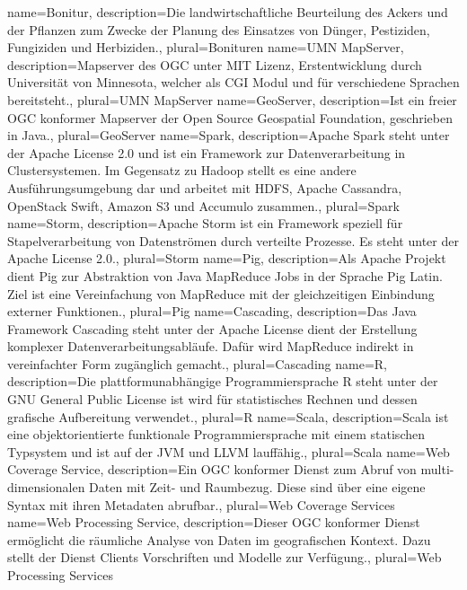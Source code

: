 {
  name=Bonitur,
  description={Die landwirtschaftliche Beurteilung des Ackers und der Pflanzen zum Zwecke der Planung des Einsatzes von Dünger, Pestiziden, Fungiziden und Herbiziden.},
  plural=Bonituren
}
{
  name=UMN MapServer,
  description={Mapserver des OGC unter MIT Lizenz, Erstentwicklung durch Universität von Minnesota, welcher als CGI Modul und für verschiedene Sprachen  bereitsteht.},
  plural=UMN MapServer
}
{
  name=GeoServer,
  description={Ist ein freier OGC konformer Mapserver der Open Source Geospatial Foundation, geschrieben in Java.},
  plural=GeoServer
}
{
  name=Spark,
  description={Apache Spark steht unter der Apache License 2.0 und ist ein Framework zur Datenverarbeitung in Clustersystemen. Im Gegensatz zu Hadoop stellt es eine andere Ausführungsumgebung dar und arbeitet mit HDFS, Apache Cassandra, OpenStack Swift, Amazon S3 und Accumulo zusammen.}, %
  plural=Spark
}
{
  name=Storm,
  description={Apache Storm ist ein Framework speziell für Stapelverarbeitung von Datenströmen durch verteilte Prozesse. Es steht unter der Apache License 2.0.},
  plural=Storm
}
{
  name=Pig,
  description={Als Apache Projekt dient Pig zur Abstraktion von Java MapReduce Jobs in der Sprache Pig Latin. Ziel ist eine Vereinfachung von MapReduce mit der gleichzeitigen Einbindung externer Funktionen.},
  plural=Pig
}
{
  name=Cascading,
  description={Das Java Framework Cascading steht unter der Apache License dient der Erstellung komplexer Datenverarbeitungsabläufe. Dafür wird MapReduce indirekt in vereinfachter Form zugänglich gemacht.},
  plural=Cascading
}
{
  name=R,
  description={Die plattformunabhängige Programmiersprache R steht unter der GNU General Public License ist wird für statistisches Rechnen und dessen grafische Aufbereitung verwendet.},
  plural=R
}
{
  name=Scala,
  description={Scala ist eine objektorientierte funktionale Programmiersprache mit einem statischen Typsystem und ist auf der JVM und LLVM lauffähig.},
  plural=Scala
}
{
  name=Web Coverage Service,
  description={Ein OGC konformer Dienst zum Abruf von multi-dimensionalen Daten mit Zeit- und Raumbezug. Diese sind über eine eigene Syntax mit ihren Metadaten abrufbar.},
  plural=Web Coverage Services
}
{
  name=Web Processing Service,
  description={Dieser OGC konformer Dienst ermöglicht die räumliche Analyse von Daten im geografischen Kontext. Dazu stellt der Dienst Clients Vorschriften und Modelle zur Verfügung.},
  plural=Web Processing Services
}
